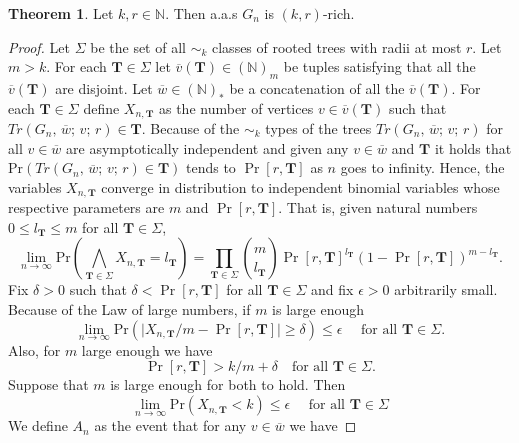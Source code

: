 \documentclass[12pt,notitlepage,a4paper]{article}
\theoremstyle{definition}
\newtheorem{theorem}{Theorem}[section]
\newcommand{\N}{\mathbb{N}}
\newcommand{\Ln}{\lim\limits_{n\to \infty}}
\begin{document}
\begin{theorem}\label{thm:rich}
	Let $k,r\in \N$. Then a.a.s $G_n$ is $(k,r)$-rich.
\end{theorem}
\begin{proof}
	Let $\Sigma$ be the set of all $\sim_k$ classes of rooted trees
	with radii at most $r$. Let $m>k$. 
	For each $\mathbf{T}\in \Sigma$
	let $\overline{v}(\mathbf{T})\in (\N)_m$ be tuples
	satisfying 
	that all the $\overline{v}(\mathbf{T})$ are
	disjoint. Let $\overline{w}\in (\N)_*$ be a concatenation
	of all the $\overline{v}(\mathbf{T})$. 
	For each $\mathbf{T}\in 
	\Sigma$ define $X_{n,\mathbf{T}}$ as the number of
	vertices $v\in \overline{v}(\mathbf{T})$ such that 
	$Tr(G_n,\,\overline{w};\,v;\,r)\in \mathbf{T}$. Because of 
	the $\sim_k$ types of the trees $Tr(G_n,\,\overline{w};\,v;\,r)$ 
	for all $v\in \overline{w}$ are asymptotically 
	independent and given any $v\in \overline{w}$ and
	$\mathbf{T}$ it holds that $\mathrm{Pr}(Tr(G_n,\,\overline{w};\,v;\,r)\in \mathbf{T})$
	tends to $\Pr[r,\mathbf{T}]$ as $n$ goes to infinity. 
	Hence,	the variables $X_{n,\mathbf{T}}$ converge in distribution to 
	independent binomial variables whose respective parameters are
	$m$ and $\Pr[r,\mathbf{T}]$. That is, given natural numbers
	$0\leq l_\mathbf{T} \leq m$ for all $\mathbf{T}\in \Sigma$, 
	\[
	\Ln
	\mathrm{Pr}\left(
	\bigwedge_{\mathbf{T}\in \Sigma} X_{n,\mathbf{T}}=l_\mathbf{T}
	\right)= 
	\prod_{\mathbf{T}\in \Sigma} \binom{m}{l_\mathbf{T}}
	\Pr[r,\mathbf{T}]^{l_\mathbf{T}}  (1-\Pr[r,\mathbf{T}] )^{m-l_\mathbf{T}}.
	\] 
	Fix $\delta>0$ such that $\delta< \Pr[r,\mathbf{T}]$ 
	for all $\mathbf{T}\in \Sigma$ and fix $\epsilon>0$ arbitrarily small.
	Because of the Law of large numbers, if $m$ is large enough
	\begin{equation}\label{eq:rich1}
	\Ln
	\mathrm{Pr}\left(
	\big| X_{n,\mathbf{T}}/m - \Pr[r,\mathbf{T}] \big| \geq \delta	
	\right) \leq \epsilon \quad \text{ for all $\mathbf{T}\in \Sigma$.}
	\end{equation}
	Also, for $m$ large enough we have 
	\begin{equation}\label{eq:rich2}
		\Pr[r,\mathbf{T}] > k/m + \delta \quad \text{for all $\mathbf{T}\in \Sigma$}.
	\end{equation}
	Suppose that $m$ is large enough for both 
	to hold. Then 
	\[
	\Ln
	\mathrm{Pr}\left(
	X_{n,\mathbf{T}} < k  \right) \leq \epsilon \quad \text{ for all $\mathbf{T}\in \Sigma$}
	\]
	We define $A_n$ as the event that
	for any $v\in \overline{w}$ we have

\end{proof}
\end{document}
